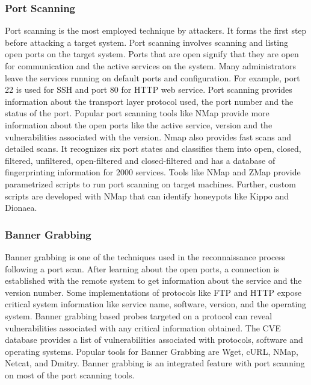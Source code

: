 \subsubsection{Port Scanning}
Port scanning is the most employed technique by attackers. It forms the first step before attacking a target system. Port scanning involves scanning and listing open ports on the target system. Ports that are open signify that they are open for communication and the active services on the system. Many administrators leave the services running on default ports and configuration. For example, port 22 is used for SSH and port 80 for HTTP web service. Port scanning provides information about the transport layer protocol used, the port number and the status of the port. Popular port scanning tools like NMap\cite{NMap} provide more information about the open ports like the active service, version and the vulnerabilities associated with the version. Nmap also provides fast scans and detailed scans. It recognizes six port states and classifies them into open, closed, filtered, unfiltered, open-filtered and closed-filtered and has a database of fingerprinting information for 2000 services. 
Tools like NMap and ZMap \cite{zmap} provide parametrized scripts to run port scanning on target machines. Further, custom scripts are developed with NMap that can identify honeypots like Kippo and Dionaea.  
\newline
\subsubsection{Banner Grabbing}
Banner grabbing is one of the techniques used in the reconnaissance process following a port scan. After learning about the open ports, a connection is established with the remote system to get information about the service and the version number. Some implementations of protocols like FTP and HTTP expose critical system information like service name, software, version, and the operating system. Banner grabbing based probes targeted on a protocol can reveal vulnerabilities associated with any critical information obtained. The CVE database \cite{CVE} provides a list of vulnerabilities associated with protocols, software and operating systems. Popular tools for Banner Grabbing are Wget, cURL, NMap, Netcat, and Dmitry. Banner grabbing is an integrated feature with port scanning on most of the port scanning tools.  
\newline
